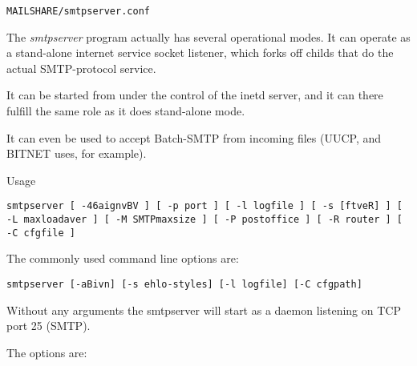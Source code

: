{\tt MAILSHARE/smtpserver.conf}

The {\em smtpserver\/} program actually has several operational modes.
It can operate as a stand-alone internet service socket listener, which
forks off childs that do the actual SMTP-protocol service.

It can be started from under the control of the inetd server, and it can
there fulfill the same role as it does stand-alone mode.

It can even be used to accept Batch-SMTP from incoming files (UUCP,
and BITNET uses, for example).

Usage

{\tt smtpserver [ -46aignvBV ] [ -p port ] [ -l logfile ] [ -s [ftveR] ] [ -L maxloadaver ] [ -M SMTPmaxsize ] [ -P postoffice ] [ -R router ] [ -C cfgfile ]}

The commonly used command line options are:

{\tt smtpserver [-aBivn] [-s ehlo-styles] [-l logfile] [-C cfgpath]}

Without any arguments the  smtpserver  will start as a daemon
listening on TCP port 25 (SMTP).

The options are:

